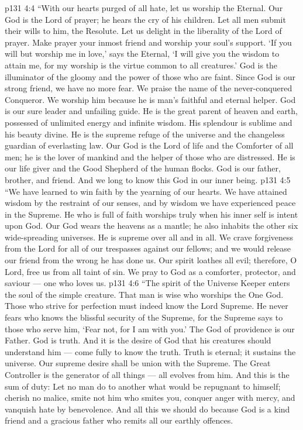 \vs p131 4:4 “With our hearts purged of all hate, let us worship the Eternal. Our God is the Lord of prayer; he hears the cry of his children. Let all men submit their wills to him, the Resolute. Let us delight in the liberality of the Lord of prayer. Make prayer your inmost friend and worship your soul’s support. ‘If you will but worship me in love,’ says the Eternal, ‘I will give you the wisdom to attain me, for my worship is the virtue common to all creatures.’ God is the illuminator of the gloomy and the power of those who are faint. Since God is our strong friend, we have no more fear. We praise the name of the never\hyp{}conquered Conqueror. We worship him because he is man’s faithful and eternal helper. God is our sure leader and unfailing guide. He is the great parent of heaven and earth, possessed of unlimited energy and infinite wisdom. His splendour is sublime and his beauty divine. He is the supreme refuge of the universe and the changeless guardian of everlasting law. Our God is the Lord of life and the Comforter of all men; he is the lover of mankind and the helper of those who are distressed. He is our life giver and the Good Shepherd of the human flocks. God is our father, brother, and friend. And we long to know this God in our inner being.
\vs p131 4:5 “We have learned to win faith by the yearning of our hearts. We have attained wisdom by the restraint of our senses, and by wisdom we have experienced peace in the Supreme. He who is full of faith worships truly when his inner self is intent upon God. Our God wears the heavens as a mantle; he also inhabits the other six wide\hyp{}spreading universes. He is supreme over all and in all. We crave forgiveness from the Lord for all of our trespasses against our fellows; and we would release our friend from the wrong he has done us. Our spirit loathes all evil; therefore, O Lord, free us from all taint of sin. We pray to God as a comforter, protector, and saviour --- one who loves us.
\vs p131 4:6 “The spirit of the Universe Keeper enters the soul of the simple creature. That man is wise who worships the One God. Those who strive for perfection must indeed know the Lord Supreme. He never fears who knows the blissful security of the Supreme, for the Supreme says to those who serve him, ‘Fear not, for I am with you.’ The God of providence is our Father. God is truth. And it is the desire of God that his creatures should understand him --- come fully to know the truth. Truth is eternal; it sustains the universe. Our supreme desire shall be union with the Supreme. The Great Controller is the generator of all things --- all evolves from him. And this is the sum of duty: Let no man do to another what would be repugnant to himself; cherish no malice, smite not him who smites you, conquer anger with mercy, and vanquish hate by benevolence. And all this we should do because God is a kind friend and a gracious father who remits all our earthly offences.
